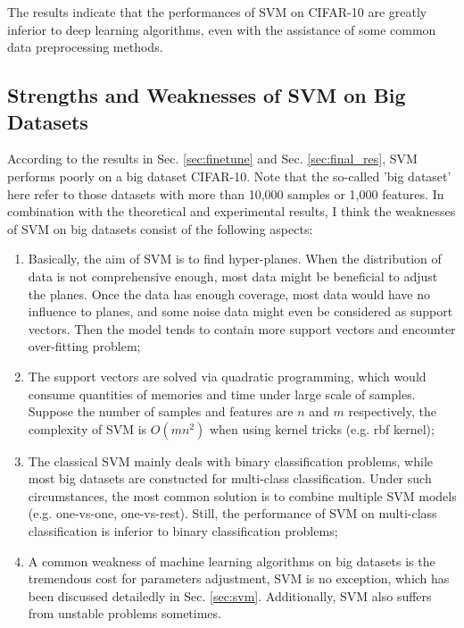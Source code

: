 \documentclass[12pt,a4paper]{article}
\theoremstyle{definition}
\begin{document}
The results indicate that the performances of SVM on CIFAR-10 are greatly inferior to deep learning algorithms, even with the assistance of some common data preprocessing methods.

\subsection{Strengths and Weaknesses of SVM on Big Datasets}

According to the results in Sec. \ref{sec:finetune} and Sec. \ref{sec:final_res}, SVM performs poorly on a big dataset CIFAR-10. Note that the so-called 'big dataset' here refer to those datasets with more than 10,000 samples or 1,000 features. In combination with the theoretical and experimental results, I think the weaknesses of SVM on big datasets consist of the following aspects:

\begin{enumerate}
	\item Basically, the aim of SVM is to find hyper-planes. When the distribution of data is not comprehensive enough, most data might be beneficial to adjust the planes. Once the data has enough coverage, most data would have no influence to planes, and some noise data might even be considered as support vectors. Then the model tends to contain more support vectors and encounter over-fitting problem;
	
	\item The support vectors are solved via quadratic programming, which would consume quantities of memories and time under large scale of samples. Suppose the number of samples and features are $n$ and $m$ respectively, the complexity of SVM is $O(mn^2)$ when using kernel tricks (e.g. rbf kernel);
	
	\item The classical SVM mainly deals with binary classification problems, while most big datasets are constucted for multi-class classification. Under such circumstances, the most common solution is to combine multiple SVM models (e.g. one-vs-one, one-vs-rest). Still, the performance of SVM on multi-class classification is inferior to binary classification problems;
	
	\item A common weakness of machine learning algorithms on big datasets is the tremendous cost for parameters adjustment, SVM is no exception, which has been discussed detailedly in Sec. \ref{sec:svm}. Additionally, SVM also suffers from unstable problems sometimes.
\end{enumerate}
\end{document}
